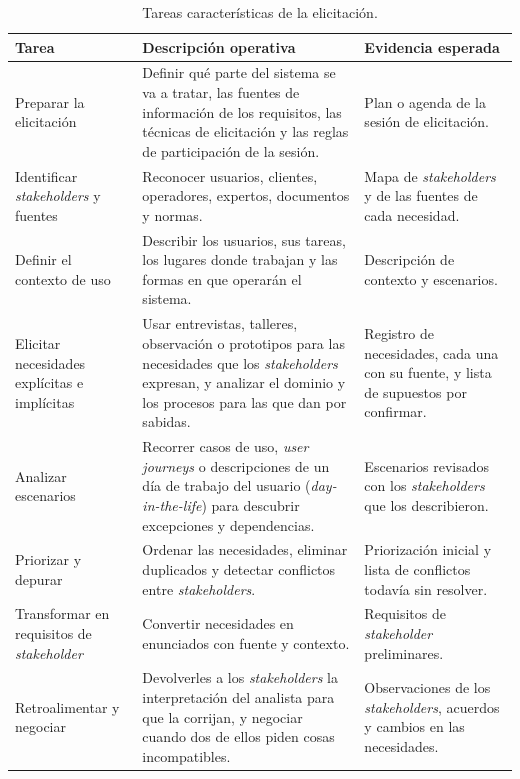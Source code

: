 \documentclass[12pt,letterpaper,oneside]{report}
\begin{document}
\begin{table}[H]
\caption{Tareas características de la elicitación.}
\label{tab:tareas_elicitacion}
\centering
\footnotesize
\renewcommand{\arraystretch}{1.12}
\begin{tabularx}{\textwidth}{@{}L{4.2cm}Y L{3.4cm}@{}}
\toprule
\textbf{Tarea} & \textbf{Descripción operativa} & \textbf{Evidencia esperada} \\
\midrule
Preparar la elicitación & Definir qué parte del sistema se va a tratar, las
fuentes de información de los requisitos, las técnicas de elicitación y las
reglas de participación de la sesión. & Plan o agenda de la sesión de elicitación. \\
Identificar \textit{stakeholders} y fuentes & Reconocer usuarios, clientes,
operadores, expertos, documentos y normas. & Mapa de \textit{stakeholders} y
de las fuentes de cada necesidad. \\
Definir el contexto de uso & Describir los usuarios, sus tareas, los lugares
donde trabajan y las formas en que operarán el sistema. & Descripción de
contexto y escenarios. \\
Elicitar necesidades explícitas e implícitas & Usar entrevistas, talleres,
observación o prototipos para las necesidades que los \textit{stakeholders}
expresan, y analizar el dominio y los procesos para las que dan por sabidas. &
Registro de necesidades, cada una con su fuente, y lista de supuestos por
confirmar. \\
Analizar escenarios & Recorrer casos de uso, \textit{user journeys} o
descripciones de un día de trabajo del usuario (\textit{day-in-the-life}) para
descubrir excepciones y dependencias. & Escenarios revisados con los
\textit{stakeholders} que los describieron. \\
Priorizar y depurar & Ordenar las necesidades, eliminar duplicados y detectar
conflictos entre \textit{stakeholders}. & Priorización inicial y lista de
conflictos todavía sin resolver. \\
Transformar en requisitos de \textit{stakeholder} & Convertir necesidades en
enunciados con fuente y contexto. & Requisitos de \textit{stakeholder}
preliminares. \\
Retroalimentar y negociar & Devolverles a los \textit{stakeholders} la
interpretación del analista para que la corrijan, y negociar cuando dos de ellos piden cosas incompatibles. & Observaciones de los \textit{stakeholders},
acuerdos y cambios en las necesidades. \\
\bottomrule
\end{tabularx}
\end{table}
\end{document}
